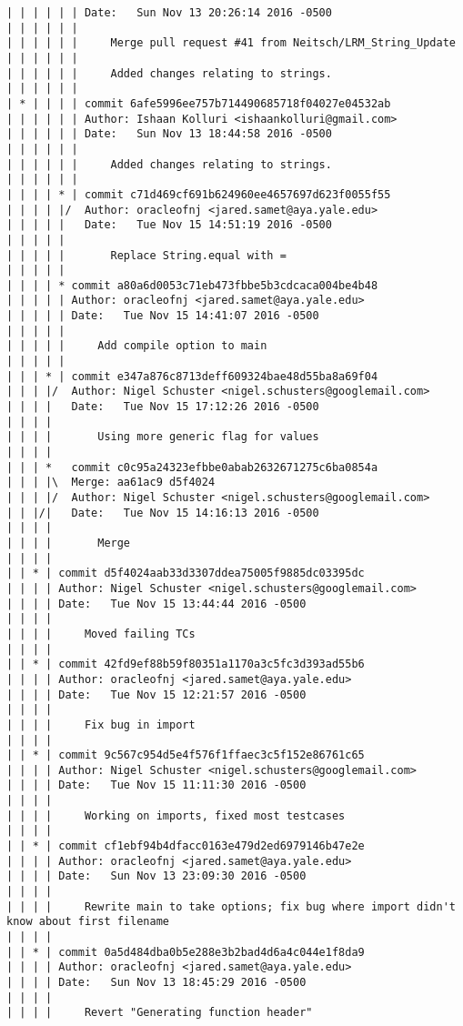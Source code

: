 \begin{lstlisting}
| | | | | | Date:   Sun Nov 13 20:26:14 2016 -0500
| | | | | | 
| | | | | |     Merge pull request #41 from Neitsch/LRM_String_Update
| | | | | |     
| | | | | |     Added changes relating to strings.
| | | | | |       
| * | | | | commit 6afe5996ee757b714490685718f04027e04532ab
| | | | | | Author: Ishaan Kolluri <ishaankolluri@gmail.com>
| | | | | | Date:   Sun Nov 13 18:44:58 2016 -0500
| | | | | | 
| | | | | |     Added changes relating to strings.
| | | | | |       
| | | | * | commit c71d469cf691b624960ee4657697d623f0055f55
| | | | |/  Author: oracleofnj <jared.samet@aya.yale.edu>
| | | | |   Date:   Tue Nov 15 14:51:19 2016 -0500
| | | | |   
| | | | |       Replace String.equal with =
| | | | |      
| | | | * commit a80a6d0053c71eb473fbbe5b3cdcaca004be4b48
| | | | | Author: oracleofnj <jared.samet@aya.yale.edu>
| | | | | Date:   Tue Nov 15 14:41:07 2016 -0500
| | | | | 
| | | | |     Add compile option to main
| | | | |      
| | | * | commit e347a876c8713deff609324bae48d55ba8a69f04
| | | |/  Author: Nigel Schuster <nigel.schusters@googlemail.com>
| | | |   Date:   Tue Nov 15 17:12:26 2016 -0500
| | | |   
| | | |       Using more generic flag for values
| | | |       
| | | *   commit c0c95a24323efbbe0abab2632671275c6ba0854a
| | | |\  Merge: aa61ac9 d5f4024
| | | |/  Author: Nigel Schuster <nigel.schusters@googlemail.com>
| | |/|   Date:   Tue Nov 15 14:16:13 2016 -0500
| | | |   
| | | |       Merge
| | | |     
| | * | commit d5f4024aab33d3307ddea75005f9885dc03395dc
| | | | Author: Nigel Schuster <nigel.schusters@googlemail.com>
| | | | Date:   Tue Nov 15 13:44:44 2016 -0500
| | | | 
| | | |     Moved failing TCs
| | | |     
| | * | commit 42fd9ef88b59f80351a1170a3c5fc3d393ad55b6
| | | | Author: oracleofnj <jared.samet@aya.yale.edu>
| | | | Date:   Tue Nov 15 12:21:57 2016 -0500
| | | | 
| | | |     Fix bug in import
| | | |     
| | * | commit 9c567c954d5e4f576f1ffaec3c5f152e86761c65
| | | | Author: Nigel Schuster <nigel.schusters@googlemail.com>
| | | | Date:   Tue Nov 15 11:11:30 2016 -0500
| | | | 
| | | |     Working on imports, fixed most testcases
| | | |     
| | * | commit cf1ebf94b4dfacc0163e479d2ed6979146b47e2e
| | | | Author: oracleofnj <jared.samet@aya.yale.edu>
| | | | Date:   Sun Nov 13 23:09:30 2016 -0500
| | | | 
| | | |     Rewrite main to take options; fix bug where import didn't know about first filename
| | | |     
| | * | commit 0a5d484dba0b5e288e3b2bad4d6a4c044e1f8da9
| | | | Author: oracleofnj <jared.samet@aya.yale.edu>
| | | | Date:   Sun Nov 13 18:45:29 2016 -0500
| | | | 
| | | |     Revert "Generating function header"

\end{lstlisting}
